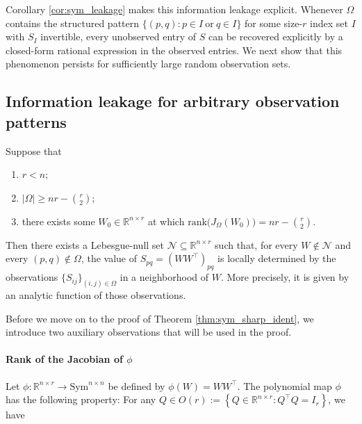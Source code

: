\documentclass{article}
\begin{document}
Corollary \ref{cor:sym_leakage} makes this information leakage explicit. Whenever $\Omega$ contains the structured pattern $\{ (p, q): p \in I \ \text{or} \ q \in I\}$ for some size-$r$ index set $I$ with $S_I$ invertible, every unobserved entry of $S$ can be recovered explicitly by a closed-form rational expression in the observed entries. We next show that this phenomenon persists for sufficiently large random observation sets.


\subsection{Information leakage for arbitrary observation patterns}

\begin{theorem}[Identifiability of $S$]
\label{thm:sym_sharp_ident}
Suppose that
\begin{enumerate}[label=(H\arabic*), ref=H\arabic*]
    \item \label{ass:r_less_n} $r < n$;
    \item \label{ass:enough_observations} $|\Omega| \geq nr - \binom{r}{2}$;
    \item \label{ass:full_jacobian} there exists some $W_0 \in \mathbb{R}^{n \times r}$ at which $\mathrm{rank}\bigl(J_\Omega(W_0)\bigr) = nr - \binom{r}{2}$.
\end{enumerate}

Then there exists a Lebesgue-null set $\mathcal{N} \subseteq \mathbb{R}^{n \times r}$ such that, for every $W \notin \mathcal{N}$ and every $(p, q) \notin \Omega$, the value of $S_{pq} = (WW^\top)_{pq}$ is locally determined by the observations $\{S_{ij}\}_{(i,j) \in \Omega}$ in a neighborhood of $W$. More precisely, it is given by an analytic function of those observations.
\end{theorem}

Before we move on to the proof of Theorem \ref{thm:sym_sharp_ident}, we introduce two auxiliary observations that will be used in the proof.

\paragraph{Rank of the Jacobian of $\phi$}
Let $\phi : \mathbb{R}^{n \times r} \to \text{Sym}^{n\times n}$ be defined by $\phi(W) = WW^{\top}$. The polynomial map $\phi$ has the following property: For any $Q \in O(r) := \left\{ Q \in \mathbb{R}^{n\times r} : Q^{\top} Q = I_r \right\}$, we have
\end{document}

